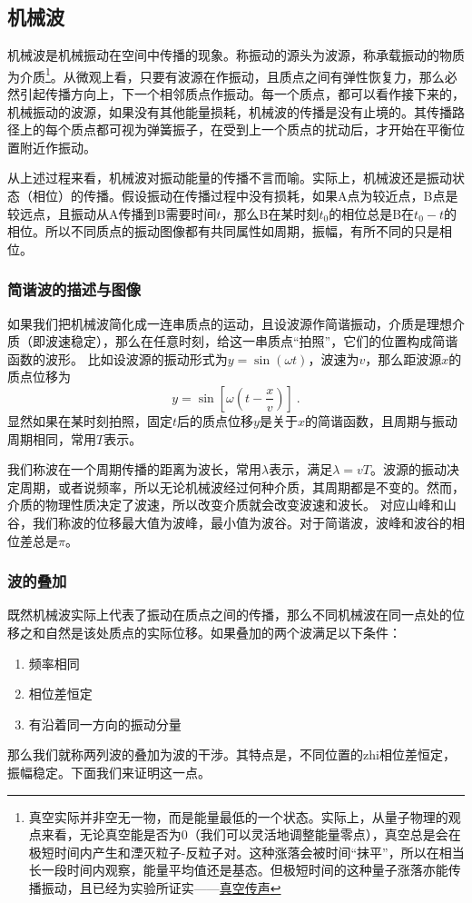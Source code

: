 
\subsection{机械波}
机械波是机械振动在空间中传播的现象。称振动的源头为波源，称承载振动的物质为介质\footnote{真空实际并非空无一物，而是能量最低的一个状态。实际上，从量子物理的观点来看，无论真空能是否为0（我们可以灵活地调整能量零点），真空总是会在极短时间内产生和湮灭粒子-反粒子对。这种涨落会被时间“抹平”，所以在相当长一段时间内观察，能量平均值还是基态。但极短时间的这种量子涨落亦能传播振动，且已经为实验所证实——\href{https://www.rmzxw.com.cn/c/2023-08-25/3399291.shtml}{真空传声}}。从微观上看，只要有波源在作振动，且质点之间有弹性恢复力，那么必然引起传播方向上，下一个相邻质点作振动。每一个质点，都可以看作接下来的，机械振动的波源，如果没有其他能量损耗，机械波的传播是没有止境的。其传播路径上的每个质点都可视为弹簧振子，在受到上一个质点的扰动后，才开始在平衡位置附近作振动。

从上述过程来看，机械波对振动能量的传播不言而喻。实际上，机械波还是振动状态（相位）的传播。假设振动在传播过程中没有损耗，如果A点为较近点，B点是较远点，且振动从A传播到B需要时间$t$，那么B在某时刻$t_0$的相位总是B在$t_0-t$的相位。所以不同质点的振动图像都有共同属性如周期，振幅，有所不同的只是相位。
\subsubsection{简谐波的描述与图像}
如果我们把机械波简化成一连串质点的运动，且设波源作简谐振动，介质是理想介质（即波速稳定），那么在任意时刻，给这一串质点“拍照”，它们的位置构成简谐函数的波形。
比如设波源的振动形式为$y=\sin(\omega t)$，波速为$v$，那么距波源$x$的质点位移为
\begin{equation}
y=\sin [\omega (t-\frac{x}{v})]~.
\end{equation}
显然如果在某时刻拍照，固定$t$后的质点位移$y$是关于$x$的简谐函数，且周期与振动周期相同，常用$T$表示。%

我们称波在一个周期传播的距离为波长，常用$\lambda $表示，满足$\lambda=vT$。波源的振动决定周期，或者说频率，所以无论机械波经过何种介质，其周期都是不变的。然而，介质的物理性质决定了波速，所以改变介质就会改变波速和波长。
对应山峰和山谷，我们称波的位移最大值为波峰，最小值为波谷。对于简谐波，波峰和波谷的相位差总是$\pi$。

\subsubsection{波的叠加}
既然机械波实际上代表了振动在质点之间的传播，那么不同机械波在同一点处的位移之和自然是该处质点的实际位移。如果叠加的两个波满足以下条件：
\begin{enumerate}
\item 频率相同
\item 相位差恒定
\item 有沿着同一方向的振动分量
\end{enumerate}
那么我们就称两列波的叠加为波的干涉。其特点是，不同位置的zhi相位差恒定，振幅稳定。下面我们来证明这一点。

